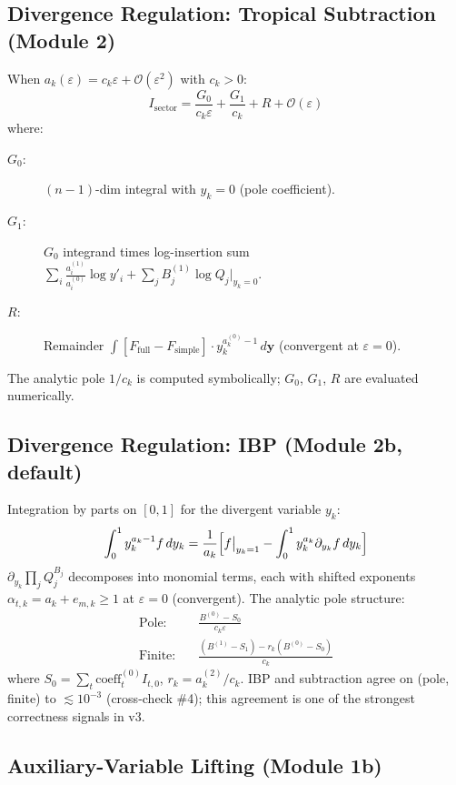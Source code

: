 \documentclass[11pt,a4paper]{article}
\begin{document}
\subsection{Divergence Regulation: Tropical Subtraction (Module 2)}

When $a_k(\varepsilon) = c_k\varepsilon + \mathcal{O}(\varepsilon^2)$ with $c_k>0$:
\begin{equation}
I_{\mathrm{sector}} = \frac{G_0}{c_k\varepsilon} + \frac{G_1}{c_k} + R + \mathcal{O}(\varepsilon)
\end{equation}
where:
\begin{description}
  \item[$G_0$:] $(n{-}1)$-dim integral with $y_k=0$ (pole coefficient).
  \item[$G_1$:] $G_0$ integrand times log-insertion sum $\sum_i\frac{a_i^{(1)}}{a_i^{(0)}}\log y'_i + \sum_j B_j^{(1)}\log Q_j|_{y_k=0}$.
  \item[$R$:] Remainder $\int[F_{\mathrm{full}}-F_{\mathrm{simple}}]\cdot y_k^{a_{k}^{(0)}-1}\,d\mathbf{y}$ (convergent at $\varepsilon=0$).
\end{description}
The analytic pole $1/c_k$ is computed symbolically; $G_0$, $G_1$, $R$ are evaluated numerically.

\subsection{Divergence Regulation: IBP (Module 2b, default)}

Integration by parts on $[0,1]$ for the divergent variable $y_k$:
\begin{equation}
\int_0^1 y_k^{a_k-1}f\,dy_k = \frac{1}{a_k}\Bigl[f\big|_{y_k=1} - \int_0^1 y_k^{a_k}\partial_{y_k}f\,dy_k\Bigr]
\end{equation}
$\partial_{y_k}\prod_j Q_j^{B_j}$ decomposes into monomial terms, each with shifted exponents $\alpha_{t,k}=a_k+e_{m,k}\geq 1$ at $\varepsilon=0$ (convergent). The analytic pole structure:
\begin{align}
\text{Pole:}\quad & \frac{B^{(0)} - S_0}{c_k\varepsilon} \\
\text{Finite:}\quad & \frac{(B^{(1)}-S_1) - r_k(B^{(0)}-S_0)}{c_k}
\end{align}
where $S_0=\sum_t\mathrm{coeff}_t^{(0)}I_{t,0}$, $r_k=a_k^{(2)}/c_k$. IBP and subtraction agree on (pole, finite) to $\lesssim 10^{-3}$ (cross-check \#4); this agreement is one of the strongest correctness signals in v3.

\subsection{Auxiliary-Variable Lifting (Module 1b)}\label{sec:lifting}
\end{document}

